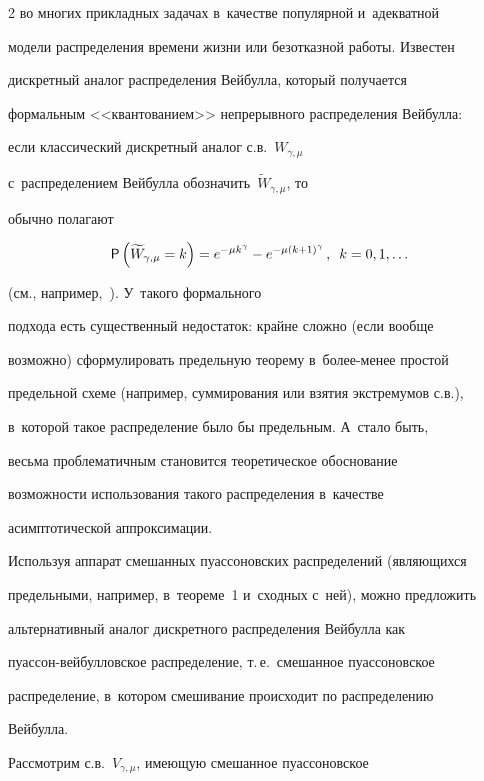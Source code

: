 \begin{multicols}{2}
во многих прикладных задачах в~качестве популярной и~адекватной


модели распределения времени жизни или безотказной работы. Известен


дискретный аналог распределения Вейбулла, который получается


формальным <<квантованием>> непрерывного распределения Вейбулла:


если классический дискретный аналог с.в.~$W_{\gamma,\mu}$ 


с~распределением Вейбулла обозначить~$\widetilde W_{\gamma,\mu}$, то


обычно полагают


$$


{\sf P}\left(\widetilde W_{\gamma,\mu}=k\right)=e^{-\mu k^{\gamma}}-


e^{-\mu(k+1)^{\gamma}}\,,\enskip k=0,1,\ldots


$$


(см., например,~\cite{NakagawaOsaki1975}). У~такого формального


подхода есть существенный недостаток: крайне сложно (если вообще


возможно) сформулировать предельную теорему в~бо\-лее-ме\-нее простой


предельной схеме (например, суммирования или взятия экстремумов с.в.), 


в~которой такое распределение было бы предельным. А~стало быть,


весьма проблематичным становится теоретическое обоснование


воз\-мож\-ности использования такого распределения в~качестве


асимптотической аппроксимации.





Используя аппарат смешанных пуассоновских распределений (являющихся


предельными, например, в~теореме~1 и~сходных с~ней), можно предложить


альтернативный аналог дискретного распределения Вейбулла как


пуас\-сон-вей\-бул\-лов\-ское распределение, т.\,е.\ смешанное пуассоновское


распределение, в~котором смешивание происходит по распределению


Вейбулла.





Рассмотрим с.в.~$V_{\gamma,\mu}$, имеющую смешанное пуассоновское



\end{multicols}
